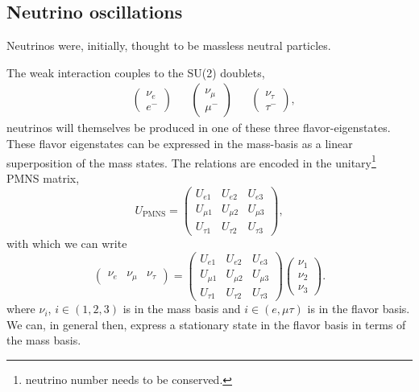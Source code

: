 \documentclass[main.tex]{subfiles}
\begin{document}
\subsection{Neutrino oscillations}

Neutrinos were, initially, thought to be massless neutral particles. 

The weak interaction couples to the SU(2) doublets,
\begin{align}
&\left(\begin{array}{c} \nu_{e} \\ e^{-} \end{array}\right) & &\left(\begin{array}{c} \nu_{\mu} \\ \mu^{-} \end{array}\right) & &\left(\begin{array}{c} \nu_{\tau} \\ \tau^{-} \end{array}\right),
\end{align}
neutrinos will themselves be produced in one of these three flavor-eigenstates.
These flavor eigenstates can be expressed in the mass-basis as a linear superposition of the mass states. 
The relations are encoded in the unitary\footnote{neutrino number needs to be conserved.} PMNS matrix, 
\begin{equation}
    U_{\text{PMNS}} = \left(\begin{array}{ccc} U_{e1} & U_{e2} & U_{e3} \\ U_{\mu 1} & U_{\mu 2} & U_{\mu 3} \\ U_{\tau 1} & U_{\tau 2} & U_{\tau 3} \end{array}\right),
\end{equation}
with which we can write
\begin{equation}
    \left(\begin{array}{ccc} \nu_{e} & \nu_{\mu} & \nu_{\tau} \end{array}\right)  = \left(\begin{array}{ccc} U_{e1} & U_{e2} & U_{e3} \\ U_{\mu 1} & U_{\mu 2} & U_{\mu 3} \\ U_{\tau 1} & U_{\tau 2} & U_{\tau 3} \end{array}\right) \left(\begin{array}{c} \nu_{1} \\ \nu_{2} \\ \nu_{3} \end{array}\right).
\end{equation}
where $\nu_{i}$, $i\in\left(1,2,3\right)$ is in the mass basis and $i\in\left(e,\mu\tau\right)$ is in the flavor basis. 
We can, in general then, express a stationary state in the flavor basis in terms of the mass basis. 
\end{document}
